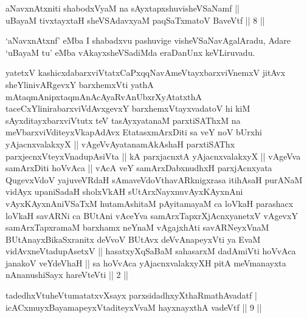 
\begin{shl}
aNavxnAtxniti shabodxV\s yaM na sAyxtapxshuvisheVSaNamf || \\
uBayaM tivxtayxtaH sheVSAdavxyaM paqSaTxmatoV BaveVtf \hfill ||  8 ||  
\end{shl}

\begin{artha}
`aNavxnAtxnf' eMba I shabadxvu pashuvige visheVSaNavAgalAradu, Adare `uBayaM tu' eMba vAkayxsheVSadiMda eraDanUnx keVLiruvadu.
\end{artha}


\begin{kandikeshl}
yatetxV kashicxdabarxviVtatxCaPxqqNavAmeVtayxbarxviVnemxV jitAvx sheYlinivARgevxY barxhemxVti yathA mAtaqmAnipxtaqmAnAcAyaRvAnUbxrXyAtatxthA taceCxYlinirabarxviVdAvxgevxY barxhemxVtayxvadatoV hi kiM sAyxditayxbarxviVtutx teV tasAyxyatanaM parxtiSAThxM na meV\s barxviVditeyxVkapAdAvx EtatasxmArxDiti sa veY noV bUrxhi yAjacnxvalakxyX || vAgeVvAyatanamAkAshaH parxtiSAThx parxjecnxVteyxVnadupAsiVta || kA parxjacnxtA yAjacnxvalakxyX || vAgeVva samArxDiti hoVvAca || vAcA veY samArxDabxnudhxH parxjAcnxyata QugevxVdoV yajuveVRdaH sAmaveVdoV\s thavARknigxrasa itihAsaH purANaM vidAyx upaniSadaH sholxVkAH sUtArxNayxnuvAyxKAyxnAni vAyxKAyxnAniVSaTxM hutamAshitaM pAyitamayaM ca loVkaH parashacx loVkaH savARNi ca BUtAni vAceYva samArxTapxrXjAcnxyanetxV vAgevxY samArxTapxramaM barxhamx neYnaM vAgajxhAti savARNeyxVnaM BUtAnayxBikaSxranitx deVvoV BUtAvx deVvAnapeyxVti ya EvaM vidAvxneVtadupAsetxV || hasatxyXqSaBaM sahasarxM dadAmiVti hoVvAca janakoV veYdeVhaH || sa hoVvAca yAjacnxvalakxyXH pitA meV\s manayxta nAnanushiSayx hareVteVti || 2 ||
\end{kandikeshl}




\begin{shl}
tadedhxVtuheVtumatatxvXsayx parxsidadhxyXthaRmathAvadatf |\\
icACxmuyxBayamapeyxVtaditeyxVvaM hayxnayxthA vadeVtf \hfill || 9 || 
\end{shl}
\vskip 2cm


